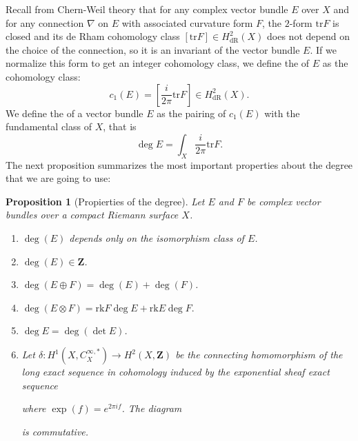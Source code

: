 \documentclass[12pt,a4paper]{book}
\newtheorem{prop}[thm]{Proposition}
\theoremstyle{definition} \newtheorem{defn}[thm]{Definition}
\theoremstyle{definition} \newtheorem{ejemplo}[thm]{Example}
\theoremstyle{remark} \newtheorem*{rem}{Remark}
\def\ZZ{\mathbf{Z}}
\def\tr{\mathrm{tr}}
\def\rk{\mathrm{rk}}
\let\emph\relax
\begin{document}
Recall from Chern-Weil theory \cite{griffithsharris,wells} that for any complex vector bundle $E$ over $X$ and for any connection $\nabla$ on $E$ with associated curvature form $F$, the $2$-form $\tr F$ is closed and its de Rham cohomology class $[\tr F]\in H_{\mathrm{dR}}^2(X)$ does not depend on the choice of the connection, so it is an invariant of the vector bundle $E$. If we normalize this form to get an integer cohomology class, we define the \emph{first Chern class} of $E$ as the cohomology class:
\begin{equation*}
  c_1(E)=\left[ \frac{i}{2\pi} \tr F \right] \in H_{\mathrm{dR}}^2(X).
\end{equation*}
We define the \emph{degree} of a vector bundle $E$ as the pairing of $c_1(E)$ with the fundamental class of $X$, that is
\begin{equation*}
  \deg E = \int_X\frac{i}{2\pi} \tr F. 
\end{equation*}
The next proposition \cite{wells} summarizes the most important properties about the degree that we are going to use:
\begin{prop}[Propierties of the degree]
  Let $E$ and $F$ be complex vector bundles over a compact Riemann surface $X$.
  \begin{enumerate}
    \item $\deg(E)$ depends only on the isomorphism class of $E$.
    \item $\deg(E) \in \mathbf{Z}$.
    \item $\deg(E\oplus F)=\deg(E)+ \deg(F)$.
    \item $\deg(E\otimes F)=\rk F \deg E + \rk E \deg F.$
    \item $\deg E=\deg(\det E) $.
    \item
      Let $\delta:H^1(X,C^{\infty,*}_X) \rightarrow H^2(X,\ZZ)$ be the connecting homomorphism of the long exact sequence in cohomology induced by the exponential sheaf exact sequence
      \begin{center}
       \end{center}
       where $\exp(f)=e^{2\pi if}$.
      The diagram
      \begin{center}
       \end{center}
       is commutative.
  \end{enumerate}
\end{prop}
\end{document}
